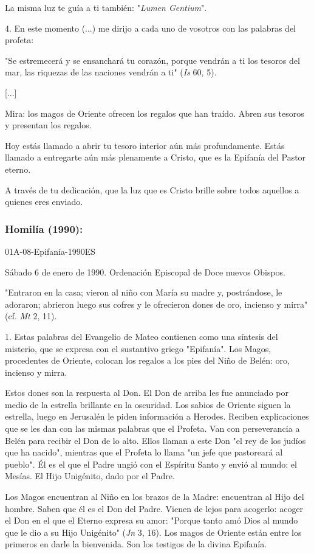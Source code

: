 \begin{body}
La misma luz te guía a ti también: "\emph{Lumen Gentium}".

4. En este momento (...) me dirijo a cada uno de vosotros con las palabras del profeta:

"Se estremecerá y se ensanchará tu corazón, porque vendrán a ti los tesoros del mar, las riquezas de las naciones vendrán a ti" (\emph{Is} 60, 5).

{[}...{]}

Mira: los magos de Oriente ofrecen los regalos que han traído. Abren sus tesoros y presentan los regalos.

Hoy estás llamado a abrir tu tesoro interior aún más profundamente. Estás llamado a entregarte aún más plenamente a Cristo, que es la Epifanía del Pastor eterno.

A través de tu dedicación, que la luz que es Cristo brille sobre todos aquellos a quienes eres enviado.

\subsubsection{Homilía (1990): } 01A-08-Epifanía-1990ES

Sábado 6 de enero de 1990. Ordenación Episcopal de Doce nuevos Obispos.

"Entraron en la casa; vieron al niño con María su madre y, postrándose, le adoraron; abrieron luego sus cofres y le ofrecieron dones de oro, incienso y mirra" (cf. \emph{Mt} 2, 11).

1. Estas palabras del Evangelio de Mateo contienen como una síntesis del misterio, que se expresa con el sustantivo griego "Epifanía". Los Magos, procedentes de Oriente, colocan los regalos a los pies del Niño de Belén: oro, incienso y mirra.

Estos dones son la respuesta al Don. El Don de arriba les fue anunciado por medio de la estrella brillante en la oscuridad. Los sabios de Oriente siguen la estrella, luego en Jerusalén le piden información a Herodes. Reciben explicaciones que se les dan con las mismas palabras que el Profeta. Van con perseverancia a Belén para recibir el Don de lo alto. Ellos llaman a este Don "el rey de los judíos que ha nacido", mientras que el Profeta lo llama "un jefe que pastoreará al pueblo". Él es el que el Padre ungió con el Espíritu Santo y envió al mundo: el Mesías. El Hijo Unigénito, dado por el Padre.

Los Magos encuentran al Niño en los brazos de la Madre: encuentran al Hijo del hombre. Saben que él es el Don del Padre. Vienen de lejos para acogerlo: acoger el Don en el que el Eterno expresa su amor: "Porque tanto amó Dios al mundo que le dio a su Hijo Unigénito" (\emph{Jn} 3, 16). Los magos de Oriente están entre los primeros en darle la bienvenida. Son los testigos de la divina Epifanía.


\end{body}
